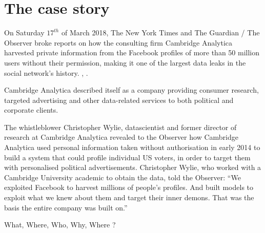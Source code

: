 \documentclass[11pt, twoside]{report}
\begin{document}
    
    \tableofcontents
    \chapter{The case story}

On Saturday $17^{th}$ of March 2018, The New York Times and The Guardian / The Observer broke reports on how the consulting firm Cambridge Analytica harvested private information from the Facebook profiles of more than 50 million users without their permission, making it one of the largest data leaks in the social network’s history. \cite{guardian}, \cite{nyt_17march}.

Cambridge Analytica described itself as a company providing consumer research, targeted advertising and other data-related services to both political and corporate clients.

The whistleblower Christopher Wylie, datascientist and former director of research at Cambridge Analytica revealed to the Observer how Cambridge Analytica used personal information taken without authorisation in early 2014 to build a system that could profile individual US voters, in order to target them with personalised political advertisements.
Christopher Wylie, who worked with a Cambridge University academic to obtain the data, told the Observer: “We exploited Facebook to harvest millions of people’s profiles. And built models to exploit what we knew about them and target their inner demons. That was the basis the entire company was built on.”

What, Where, Who, Why, Where ?
\end{document}
